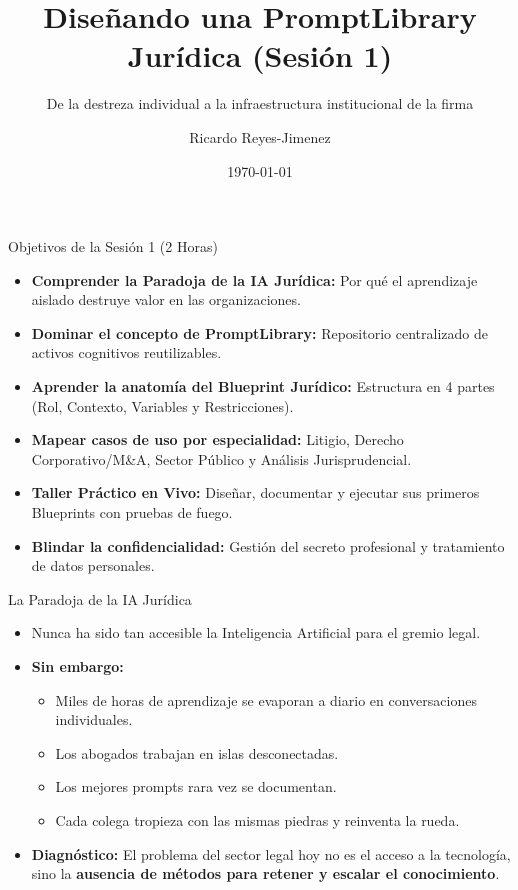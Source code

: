 \documentclass[aspectratio=169]{beamer}
\title[ Diseñando una PromptLibrary J]{ Diseñando una PromptLibrary Jurídica (Sesión 1)}
\subtitle{ De la destreza individual a la infraestructura institucional de la firma}
\author{Ricardo Reyes-Jimenez}
\institute{Universidad de La Sabana}
\date{\today}
\begin{document}
\begin{frame}
  \titlepage
\end{frame}

\usebackgroundtemplate{}


\begin{frame}{Objetivos de la Sesión 1 (2 Horas)}

\begin{itemize}
  \item \textbf{Comprender la Paradoja de la IA Jurídica:} Por qué el aprendizaje aislado destruye valor en las organizaciones.
  \item \textbf{Dominar el concepto de PromptLibrary:} Repositorio centralizado de activos cognitivos reutilizables.
  \item \textbf{Aprender la anatomía del Blueprint Jurídico:} Estructura en 4 partes (Rol, Contexto, Variables y Restricciones).
  \item \textbf{Mapear casos de uso por especialidad:} Litigio, Derecho Corporativo/M\&A, Sector Público y Análisis Jurisprudencial.
  \item \textbf{Taller Práctico en Vivo:} Diseñar, documentar y ejecutar sus primeros Blueprints con pruebas de fuego.
  \item \textbf{Blindar la confidencialidad:} Gestión del secreto profesional y tratamiento de datos personales.
\end{itemize}
\end{frame}

\begin{frame}{La Paradoja de la IA Jurídica}

\begin{itemize}
  \item Nunca ha sido tan accesible la Inteligencia  Artificial para el gremio legal.
  \item \textbf{Sin embargo:}
  \begin{itemize}
    \item Miles de horas de aprendizaje se evaporan a diario en conversaciones individuales.
    \item Los abogados trabajan en islas desconectadas.
    \item Los mejores prompts rara vez se documentan.
    \item Cada colega tropieza con las mismas piedras y reinventa la rueda.
  \end{itemize}
  \item \textbf{Diagnóstico:} El problema del sector legal hoy no es el acceso a la tecnología, sino la \textbf{ausencia de métodos para retener y escalar el conocimiento}.
\end{itemize}
\end{frame}
\end{document}
